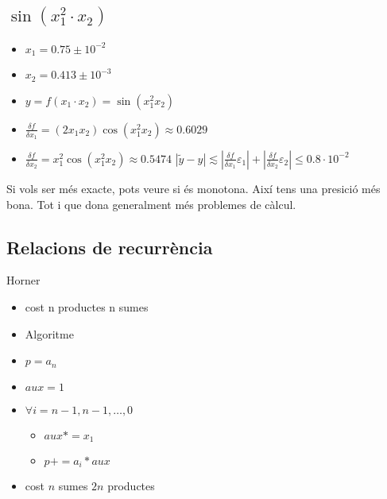 \documentclass{article}
\begin{document}
\subsection{$\sin(x^2_1 \cdot x_2)$}
\begin{itemize}
	\item $x_1 = 0.75 \pm 10^{-2}$
	\item $x_2 = 0.413\pm 10^{-3}$
	\item $y = f(x_1 \cdot x_2) = \sin (x_1^2 x_2)$
	\item $\frac{\delta f}{\delta x_1} = (2 x_1 x_2)\cos(x_1^2x_2) \approx 0.6029$
	\item $\frac{\delta f}{\delta x_2} = x_1^2 \cos(x_1^2x_2) \approx 0.5474$
		\subitem $|\tilde y - y| \lesssim |\frac{\delta f}{\delta x_1} \varepsilon_1| + |\frac{\delta f}{\delta x_2} \varepsilon_2|
			\le 0.8 \cdot 10^{-2}$
\end{itemize}
Si vols ser més exacte, pots veure si és monotona. Així tens una presició més bona. Tot i que dona generalment més problemes de càlcul.

\subsection{Relacions de recurrència}
Horner
\begin{itemize}
\item cost
	\subitem n productes
	\subitem n sumes
\item Algoritme
\item $p = a_n$
\item $aux = 1$
\item $\forall i = n-1, n-1, \dots , 0$
	\begin{itemize}
	\item $aux *= x_1$
	\item $p += a_i * aux$
	\end{itemize}
\item cost
	\subitem $n$ sumes
	\subitem $2n$ productes

\end{itemize}
\end{document}

